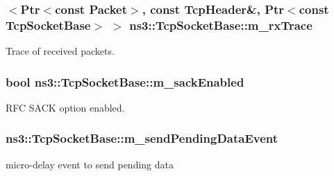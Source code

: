 \subsubsection[{\texorpdfstring{m\+\_\+rx\+Trace}{m_rxTrace}}]{$<${\bf Ptr}$<$const {\bf Packet}$>$, const {\bf Tcp\+Header}\&, {\bf Ptr}$<$const {\bf Tcp\+Socket\+Base}$>$ $>$ ns3\+::\+Tcp\+Socket\+Base\+::m\+\_\+rx\+Trace\hspace{0.3cm}{\ttfamily [protected]}}\hypertarget{classns3_1_1TcpSocketBase_a27b35f098b956baf89388fff0d4e539b}{}\label{classns3_1_1TcpSocketBase_a27b35f098b956baf89388fff0d4e539b}


Trace of received packets. 

\subsubsection[{\texorpdfstring{m\+\_\+sack\+Enabled}{m_sackEnabled}}]{\setlength{\rightskip}{0pt plus 5cm}bool ns3\+::\+Tcp\+Socket\+Base\+::m\+\_\+sack\+Enabled\hspace{0.3cm}{\ttfamily [protected]}}\hypertarget{classns3_1_1TcpSocketBase_af79c709855a362f331251ef73167209a}{}\label{classns3_1_1TcpSocketBase_af79c709855a362f331251ef73167209a}


R\+FC S\+A\+CK option enabled. 

\subsubsection[{\texorpdfstring{m\+\_\+send\+Pending\+Data\+Event}{m_sendPendingDataEvent}}]{ ns3\+::\+Tcp\+Socket\+Base\+::m\+\_\+send\+Pending\+Data\+Event\hspace{0.3cm}{\ttfamily [protected]}}\hypertarget{classns3_1_1TcpSocketBase_a84be5c63b5ebf8e2452b43f9def59cab}{}\label{classns3_1_1TcpSocketBase_a84be5c63b5ebf8e2452b43f9def59cab}


micro-\/delay event to send pending data 

